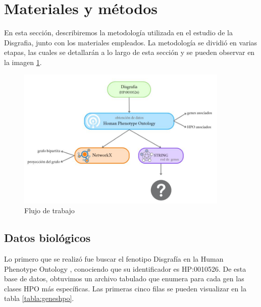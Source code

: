 \section{Materiales y métodos}

En esta sección, describiremos la metodología utilizada en el estudio de la Disgrafia,
junto con los materiales empleados. La metodología se dividió en varias etapas, las
cuales se detallarán a lo largo de esta sección y se pueden observar en la imagen \ref{fig:workflow}.

\begin{figure}[h!]
	\includegraphics[width=0.9\textwidth]{figures/workflow.JPG}
	\caption{Flujo de trabajo}
	\label{fig:workflow}
\end{figure}

\subsection{Datos biológicos}

Lo primero que se realizó fue buscar el fenotipo Disgrafía en la Human Phenotype Ontology \cite{HPO2021}, conociendo que su identificador es HP:0010526. De esta base de datos, obtuvimos un archivo tabulado que enumera para cada gen las clases HPO más específicas. Las primeras cinco filas se pueden visualizar en la tabla \ref{tabla:geneshpo}.

\begin{table}[h]
	\centering
	\caption{Cabecera del archivo}
	\label{tabla:geneshpo}
\end{table}

